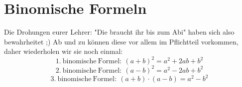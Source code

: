 \section{Binomische Formeln}
Die Drohungen eurer Lehrer: "Die braucht ihr bis zum Abi" haben sich also bewahrheitet ;) Ab und zu können diese vor allem im Pflichtteil vorkommen, daher wiederholen wir sie noch einmal:
\[\mathrm{1.\ binomische\ Formel:\ }(a+b)^2=a^2+2ab+b^2\]
\[\mathrm{2.\ binomische\ Formel:\ }(a-b)^2=a^2-2ab+b^2\]
\[\mathrm{3.\ binomische\ Formel:\ }(a+b)\cdot (a-b)=a^2-b^2\]